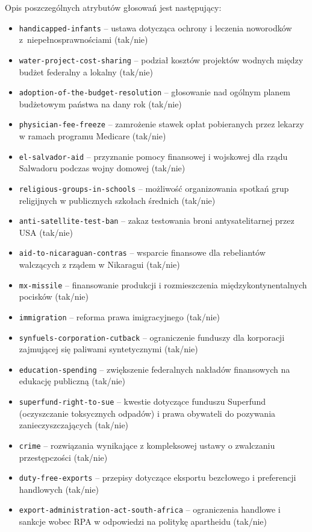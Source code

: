 \documentclass[12pt,twoside]{article}
\begin{document}
Opis poszczególnych atrybutów głosowań jest następujący:
\begin{itemize}[label={\textbullet}]
\item \texttt{handicapped-infants} -- ustawa dotycząca ochrony i leczenia noworodków z~niepełnosprawnościami (tak/nie)
\item \texttt{water-project-cost-sharing} -- podział kosztów projektów wodnych między budżet federalny a lokalny (tak/nie)
\item \texttt{adoption-of-the-budget-resolution} -- głosowanie nad ogólnym planem budżetowym państwa na dany rok (tak/nie)
\item \texttt{physician-fee-freeze} -- zamrożenie stawek opłat pobieranych przez lekarzy w ramach programu Medicare (tak/nie)
\item \texttt{el-salvador-aid} -- przyznanie pomocy finansowej i wojskowej dla rządu Salwadoru podczas wojny domowej (tak/nie)
\item \texttt{religious-groups-in-schools} -- możliwość organizowania spotkań grup religijnych w publicznych szkołach średnich (tak/nie)
\item \texttt{anti-satellite-test-ban} -- zakaz testowania broni antysatelitarnej przez USA (tak/nie)
\item \texttt{aid-to-nicaraguan-contras} -- wsparcie finansowe dla rebeliantów walczących z rządem w Nikaragui (tak/nie)
\item \texttt{mx-missile} -- finansowanie produkcji i rozmieszczenia międzykontynentalnych pocisków (tak/nie)
\item \texttt{immigration} -- reforma prawa imigracyjnego (tak/nie)
\item \texttt{synfuels-corporation-cutback} -- ograniczenie funduszy dla korporacji zajmującej się paliwami syntetycznymi (tak/nie)
\item \texttt{education-spending} -- zwiększenie federalnych nakładów finansowych na edukację publiczną (tak/nie)
\item \texttt{superfund-right-to-sue} -- kwestie dotyczące funduszu Superfund (oczyszczanie toksycznych odpadów) i prawa obywateli do pozywania zanieczyszczających (tak/nie)
\item \texttt{crime} -- rozwiązania wynikające z kompleksowej ustawy o zwalczaniu przestępczości (tak/nie)
\item \texttt{duty-free-exports} -- przepisy dotyczące eksportu bezcłowego i preferencji handlowych (tak/nie)
\item \texttt{export-administration-act-south-africa} -- ograniczenia handlowe i sankcje wobec RPA w odpowiedzi na politykę apartheidu (tak/nie)
\end{itemize}
\end{document}
